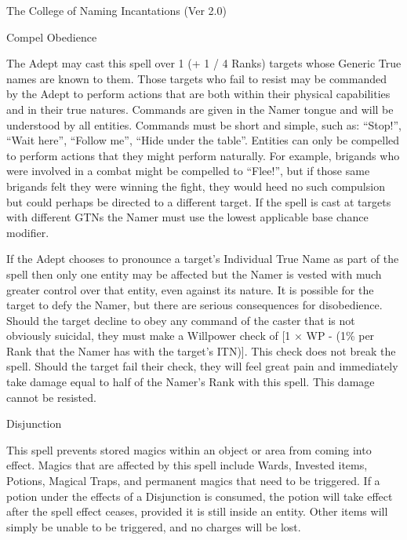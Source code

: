 \begin{Chapter}{The College of Naming Incantations (Ver 2.0)}
\begin{spell}[S-3]{Compel Obedience}

\begin{effects}
The Adept may cast this spell over 1 (+ 1 / 4 Ranks) targets whose
Generic True names are known to them.  Those targets who fail to
resist may be commanded by the Adept to perform actions that are
both within their physical capabilities and in their true natures.
Commands are given in the Namer tongue and will be understood by all
entities. Commands must be short and simple, such as: “Stop!”, “Wait
here”, “Follow me”, “Hide under the table”. Entities can only be
compelled to perform actions that they might perform naturally.  For
example, brigands who were involved in a combat might be compelled to
“Flee!”, but if those same brigands felt they were winning the fight,
they would heed no such compulsion but could perhaps be directed to a
different target. If the spell is cast at targets with different GTNs
the Namer must use the lowest applicable base chance modifier.

If the Adept chooses to pronounce a target’s Individual True Name as
part of the spell then only one entity may be affected but the Namer
is vested with much greater control over that entity, even against its
nature.  It is possible for the target to defy the Namer, but there
are serious consequences for disobedience. Should the target decline
to obey any command of the caster that is not obviously suicidal, they
must make a Willpower check of [1 × WP - (1\% per Rank that the Namer
  has with the target’s ITN)]. This check does not break the spell.
Should the target fail their check, they will feel great pain and
immediately take damage equal to half of the Namer’s Rank with this
spell. This damage cannot be resisted.
\end{effects}
\end{spell}

\begin{spell}[S-4]{Disjunction}

\begin{effects}
This spell prevents stored magics within an object or area from coming
into effect. Magics that are affected by this spell include Wards,
Invested items, Potions, Magical Traps, and permanent magics that need
to be triggered.  If a potion under the effects of a Disjunction is
consumed, the potion will take effect after the spell effect ceases,
provided it is still inside an entity.  Other items will simply be
unable to be triggered, and no charges will be lost.
\end{effects}
\end{spell}


\end{Chapter}
